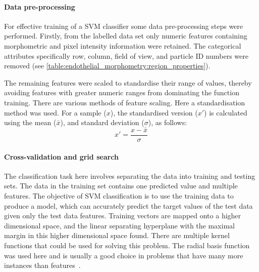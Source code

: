 \paragraph{Data pre-processing}
For effective training of a SVM classifier some data pre-processing steps were performed. Firstly, from the labelled data set only numeric features containing morphometric and pixel intensity information were retained. The categorical attributes specifically row, column, field of view, and particle ID numbers were removed (see \autoref{table:endothelial_morphometry:region_properties}).

The remaining features were scaled to standardise their range of values, thereby avoiding features with greater numeric ranges from dominating the function training. There are various methods of feature scaling. Here a standardisation method was used. For a sample ($x$), the standardised version ($x'$) is calculated using the mean ($\bar{x}$), and standard deviation ($\sigma$), as follows:
\begin{equation}
x'=\frac{x-\bar{x}}{\sigma}
\end{equation}

\paragraph{Cross-validation and grid search}
The classification task here involves separating the data into training and testing sets. The data in the training set contains one predicted value and multiple features. The objective of SVM classification is to use the training data to produce a model, which can accurately predict the target values of the test data given only the test data features. Training vectors are mapped onto a higher dimensional space, and the linear separating hyperplane with the maximal margin in this higher dimensional space found. There are multiple kernel functions that could be used for solving this problem. The radial basis function was used here and is usually a good choice in problems that have many more instances than features~\cite{Hsu2008}.


